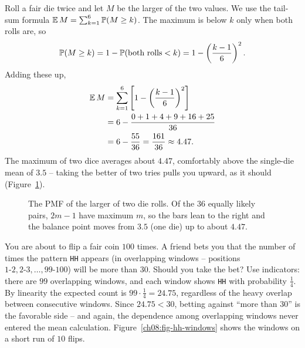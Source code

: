 \begin{example}
\label{ch08:ex-max}
Roll a fair die twice and let $M$ be the larger of the two values. We use the
tail-sum formula $\E M = \sum_{k=1}^6 \P(M \ge k)$. The maximum is below $k$
only when both rolls are, so
\[
  \P(M \ge k) = 1 - \P(\text{both rolls} < k) = 1 - \left(\frac{k-1}{6}\right)^2.
\]
Adding these up,
\begin{align*}
  \E M &= \sum_{k=1}^{6}\left[1 - \left(\frac{k-1}{6}\right)^2\right]\\
       &= 6 - \frac{0+1+4+9+16+25}{36}\\
       &= 6 - \frac{55}{36} = \frac{161}{36} \approx 4.47.
\end{align*}
The maximum of two dice averages about $4.47$, comfortably above the single-die
mean of $3.5$ -- taking the better of two tries pulls you upward, as it should
(Figure~\ref{ch08:fig-max-two-dice}).
\end{example}

\begin{figure}[H]
\centering
{}
\caption{The PMF of the larger of two die rolls. Of the $36$ equally likely
pairs, $2m-1$ have maximum $m$, so the bars lean to the right and the balance
point moves from $3.5$ (one die) up to about $4.47$.}
\label{ch08:fig-max-two-dice}
\end{figure}

\begin{walkbox}
You are about to flip a fair coin $100$ times. A friend bets you that the number
of times the pattern \texttt{HH} appears (in overlapping windows -- positions
$1\text{-}2, 2\text{-}3, \dots, 99\text{-}100$) will be more than $30$. Should you
take the bet? Use indicators: there are $99$ overlapping windows, and each window
shows \texttt{HH} with probability $\tfrac14$. By linearity the expected count is
$99\cdot\tfrac14 = 24.75$, regardless of the heavy overlap between consecutive
windows. Since $24.75 < 30$, betting against ``more than $30$'' is the favorable
side -- and again, the dependence among overlapping windows never entered the
mean calculation. Figure~\ref{ch08:fig-hh-windows} shows the windows on a short
run of $10$ flips.
\end{walkbox}

